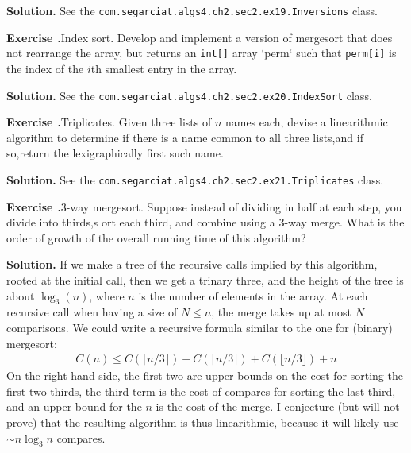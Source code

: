 \documentclass[12pt, a4paper]{article}
\newenvironment{ex}[2][Exercise]
{\par\medskip\noindent \textbf{#1 #2.}}
{\medskip}
\newenvironment{sol}[1][Solution]
{\par\medskip\noindent \textbf{#1.} }
{\medskip}
\begin{document}
	\begin{sol}
		See the \texttt{com.segarciat.algs4.ch2.sec2.ex19.Inversions} class.
	\end{sol}
	\begin{ex}{20}
		\emph{Index sort}. Develop and implement a version of mergesort that does not
		rearrange the array, but returns an \texttt{int[]} array `perm` such that \texttt{perm[i]}
		is the index of the $i$th smallest entry in the array.
	\end{ex}
	\begin{sol}
		See the \texttt{com.segarciat.algs4.ch2.sec2.ex20.IndexSort} class.
	\end{sol}
	\begin{ex}{21}
		\emph{Triplicates}. Given three lists of $n$ names each, devise a linearithmic
		algorithm to determine if there is a name common to all three lists,and if so,return
		the lexigraphically first such name.
	\end{ex}
	\begin{sol}
		See the \texttt{com.segarciat.algs4.ch2.sec2.ex21.Triplicates} class.
	\end{sol}
	\begin{ex}{22}
		\emph{3-way mergesort}. Suppose instead of dividing in half at each step, you
		divide into thirds,s ort each  third, and combine using a 3-way merge. What is
		the order of growth of the overall running time of this algorithm?
	\end{ex}
	\begin{sol}
		If we make a tree of the recursive calls implied by this algorithm, rooted
		at the initial call, then we get a trinary three, and the height of the
		tree is about $\log_3(n)$, where $n$ is the number of elements in the
		array. At each recursive call when having a size of $N\leq n$, the
		merge takes up at most $N$ comparisons. We could write a recursive formula
		similar to the one for (binary) mergesort:
		\begin{align*}
			C(n)\leq C(\lceil n / 3\rceil) + C(\lceil n / 3 \rceil) + C(\lfloor n / 3 \rfloor ) + n
		\end{align*}
		On the right-hand side, the first two are upper bounds on the cost for sorting the
		first two thirds, the third term is the cost of compares for sorting the last third,
		and an upper bound for the $n$ is the cost of the merge. I conjecture (but
		will not prove) that the resulting algorithm is thus linearithmic, because
		it will likely use $\sim n\log_3n$ compares.
	\end{sol}
\end{document}

